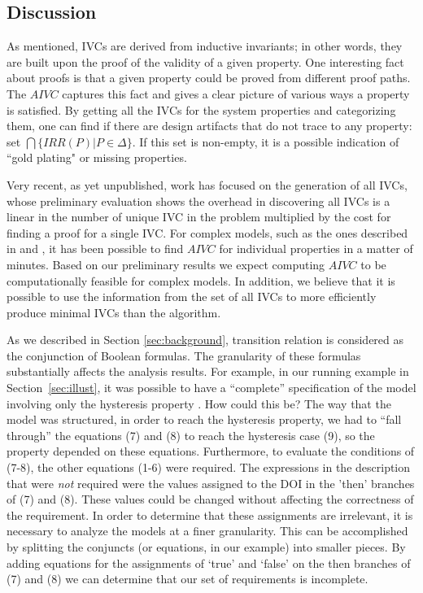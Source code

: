 \subsection{Discussion}
\label{sec:discussion}
As mentioned, IVCs are derived from inductive invariants; in other words, they are built upon the proof of the validity of a given property. One interesting fact about proofs
  is that a given property could be proved from different proof paths. 
  The $AIVC$ captures this fact and gives a clear picture of various ways a property is satisfied. By getting all the IVCs for the system properties and categorizing them, one can find if there are design artifacts that do not trace to any property: set $\bigcap \{IRR (P) | P \in \Delta \}$.  If this set is non-empty, it is a possible indication of ``gold plating" or missing properties. 

Very recent, as yet unpublished, work has focused on the
generation of all IVCs, whose preliminary evaluation
shows the overhead in discovering all IVCs is a linear in the
number of unique IVC in the problem multiplied by the cost
for finding a proof for a single IVC. For complex models, such
as the ones described in \cite {QFCS15:backes} and \cite{hilt2013}, it has been possible to
find $AIVC$ for individual properties in a matter of minutes.
Based on our preliminary results we expect computing $AIVC$ to be computationally feasible for complex models. In
addition, we believe that it is possible to use the information
from the set of all IVCs to more efficiently produce minimal
IVCs than the \ucbfalg algorithm. 

As we described in Section \ref{sec:background}, transition relation is considered
as the conjunction of Boolean formulas. The granularity of these formulas substantially affects the analysis results.  For example, in our running example in Section~\ref{sec:illust}, it was possible to have a ``complete'' specification of the model involving only the hysteresis property \hystp.  How could this be?  The way that the model was structured, in order to reach the hysteresis property, we had to ``fall through'' the equations (7) and (8) to reach the hysteresis case (9), so the property depended on these equations.  Furthermore, to evaluate the conditions of (7-8), the other equations (1-6) were required.  The expressions in the description that were {\em not} required were the values assigned to the DOI in the 'then' branches of (7) and (8).  These values could be changed without affecting the correctness of the requirement.  In order to determine that these assignments are irrelevant, it is necessary to analyze the models at a finer granularity.  This can be accomplished by splitting the conjuncts (or equations, in our example) into smaller pieces.  By adding equations for the assignments of `true' and `false' on the then branches of (7) and (8) we can determine that our set of requirements is incomplete.

